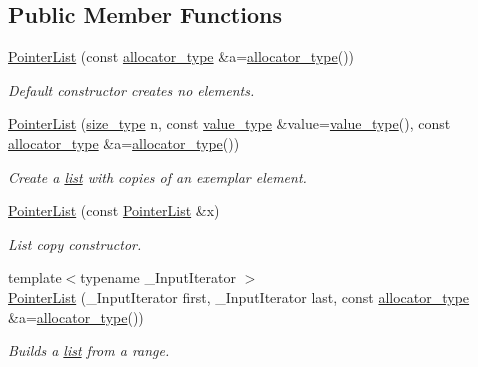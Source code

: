 \subsection*{Public Member Functions}
\begin{DoxyCompactItemize}
\item 
\hyperlink{classutils_1_1PointerList_aabad19d5a33c52b25ea3c7ff65fff4bd}{Pointer\+List} (const \hyperlink{classutils_1_1PointerList_a3b41bb503c3d41a7120b1a9cd1ba9848}{allocator\+\_\+type} \&a=\hyperlink{classutils_1_1PointerList_a3b41bb503c3d41a7120b1a9cd1ba9848}{allocator\+\_\+type}())
\begin{DoxyCompactList}\small\item\em Default constructor creates no elements. \end{DoxyCompactList}\item 
\hyperlink{classutils_1_1PointerList_afc8d53379d6f553abb47460eb589f67c}{Pointer\+List} (\hyperlink{classutils_1_1PointerList_a8d7b485e236a01cc14b41694ae0b3456}{size\+\_\+type} n, const \hyperlink{classutils_1_1PointerList_af1c536b3d0d508b69700ad038ea5279a}{value\+\_\+type} \&value=\hyperlink{classutils_1_1PointerList_af1c536b3d0d508b69700ad038ea5279a}{value\+\_\+type}(), const \hyperlink{classutils_1_1PointerList_a3b41bb503c3d41a7120b1a9cd1ba9848}{allocator\+\_\+type} \&a=\hyperlink{classutils_1_1PointerList_a3b41bb503c3d41a7120b1a9cd1ba9848}{allocator\+\_\+type}())
\begin{DoxyCompactList}\small\item\em Create a \hyperlink{protocollist-p}{list} with copies of an exemplar element. \end{DoxyCompactList}\item 
\hyperlink{classutils_1_1PointerList_a134b56062d58f09feb8a2fcdb1f013d6}{Pointer\+List} (const \hyperlink{classutils_1_1PointerList}{Pointer\+List} \&x)
\begin{DoxyCompactList}\small\item\em List copy constructor. \end{DoxyCompactList}\item 
{\footnotesize template$<$typename \+\_\+\+Input\+Iterator $>$ }\\\hyperlink{classutils_1_1PointerList_aca676638d7eb111ee7800cfe6e74a3ee}{Pointer\+List} (\+\_\+\+Input\+Iterator first, \+\_\+\+Input\+Iterator last, const \hyperlink{classutils_1_1PointerList_a3b41bb503c3d41a7120b1a9cd1ba9848}{allocator\+\_\+type} \&a=\hyperlink{classutils_1_1PointerList_a3b41bb503c3d41a7120b1a9cd1ba9848}{allocator\+\_\+type}())
\begin{DoxyCompactList}\small\item\em Builds a \hyperlink{protocollist-p}{list} from a range. \end{DoxyCompactList}\item 

\end{DoxyCompactItemize}
